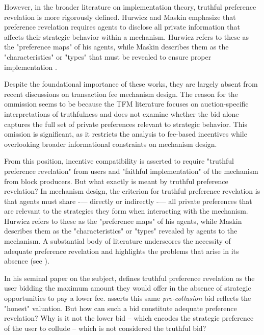 \documentclass[oneside]{article}   	%
\begin{document}
However, in the broader literature on implementation theory, truthful preference revelation is more rigorously defined. Hurwicz and Maskin emphasize that preference revelation requires agents to disclose all private information that affects their strategic behavior within a mechanism. Hurwicz refers to these as the "preference maps" of his agents, while Maskin describes them as the "characteristics" or "types" that must be revealed to ensure proper implementation \cite{hurwicz1973design, hurwicz1960optimality, hurwicz2007guardians, hurwicz1979allocations, maskin1999nash, maskin2002implementation}.

Despite the foundational importance of these works, they are largely absent from recent discussions on transaction fee mechanism design. The reason for the ommission seems to be because the TFM literature focuses on auction-specific interpretations of truthfulness and does not examine whether the bid alone captures the full set of private preferences relevant to strategic behavior. This omission is significant, as it restricts the analysis to fee-based incentives while overlooking broader informational constraints on mechanism design.

From this position, incentive compatibility is asserted to require "truthful preference revelation" from users and "faithful implementation" of the mechanism from block producers. But what exactly is meant by truthful preference revelation? In mechanism design, the criterion for truthful preference revelation is that agents must share -— directly or indirectly -— all private preferences that are relevant to the strategies they form when interacting with the mechanism. Hurwicz refers to these as the "preference maps" of his agents, while Maskin describes them as the "characteristics" or "types" revealed by agents to the mechanism. A substantial body of literature underscores the necessity of adequate preference revelation and highlights the problems that arise in its absence (see \cite{hurwicz1973design, hurwicz1960optimality, hurwicz2007guardians, hurwicz1979allocations, maskin1999nash, maskin2002implementation}).

In his seminal paper on the subject, \cite{roughgarden2024} defines truthful preference revelation as the user bidding the maximum amount they would offer in the absence of strategic opportunities to pay a lower fee. \cite{chung2023foundations} asserts this same \textit{pre-collusion} bid reflects the "honest" valuation. But how can such a bid constitute adequate preference revelation? Why is it not the lower bid -- which encodes the strategic preference of the user to collude -- which is not considered the truthful bid?
\end{document}
